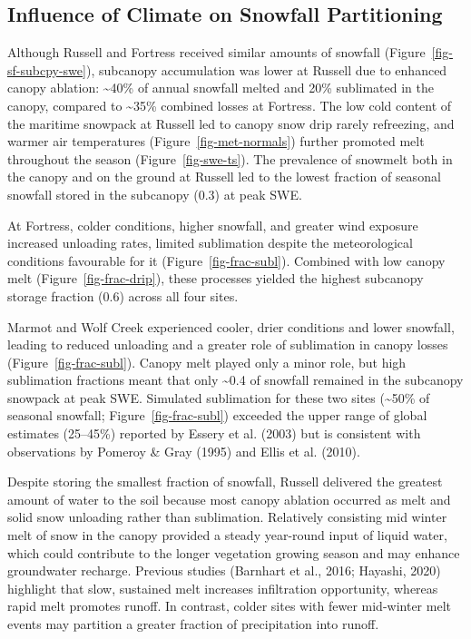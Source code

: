 \documentclass[
  letterpaper,
]{tex/uofsthesis-cs}
\begin{document}
\subsection{Influence of Climate on Snowfall
Partitioning}\label{influence-of-climate-on-snowfall-partitioning}

Although Russell and Fortress received similar amounts of snowfall
(Figure~\ref{fig-sf-subcpy-swe}), subcanopy accumulation was lower at
Russell due to enhanced canopy ablation: \textasciitilde40\% of annual
snowfall melted and 20\% sublimated in the canopy, compared to
\textasciitilde35\% combined losses at Fortress. The low cold content of
the maritime snowpack at Russell led to canopy snow drip rarely
refreezing, and warmer air temperatures (Figure~\ref{fig-met-normals})
further promoted melt throughout the season (Figure~\ref{fig-swe-ts}).
The prevalence of snowmelt both in the canopy and on the ground at
Russell led to the lowest fraction of seasonal snowfall stored in the
subcanopy (0.3) at peak SWE.

At Fortress, colder conditions, higher snowfall, and greater wind
exposure increased unloading rates, limited sublimation despite the
meteorological conditions favourable for it
(Figure~\ref{fig-frac-subl}). Combined with low canopy melt
(Figure~\ref{fig-frac-drip}), these processes yielded the highest
subcanopy storage fraction (0.6) across all four sites.

Marmot and Wolf Creek experienced cooler, drier conditions and lower
snowfall, leading to reduced unloading and a greater role of sublimation
in canopy losses (Figure~\ref{fig-frac-subl}). Canopy melt played only a
minor role, but high sublimation fractions meant that only
\textasciitilde0.4 of snowfall remained in the subcanopy snowpack at
peak SWE. Simulated sublimation for these two sites (\textasciitilde50\%
of seasonal snowfall; Figure~\ref{fig-frac-subl}) exceeded the upper
range of global estimates (25--45\%) reported by Essery et al. (2003)
but is consistent with observations by Pomeroy \& Gray (1995) and Ellis
et al. (2010).

Despite storing the smallest fraction of snowfall, Russell delivered the
greatest amount of water to the soil because most canopy ablation
occurred as melt and solid snow unloading rather than sublimation.
Relatively consisting mid winter melt of snow in the canopy provided a
steady year-round input of liquid water, which could contribute to the
longer vegetation growing season and may enhance groundwater recharge.
Previous studies (Barnhart et al., 2016; Hayashi, 2020) highlight that
slow, sustained melt increases infiltration opportunity, whereas rapid
melt promotes runoff. In contrast, colder sites with fewer mid-winter
melt events may partition a greater fraction of precipitation into
runoff.
\end{document}
